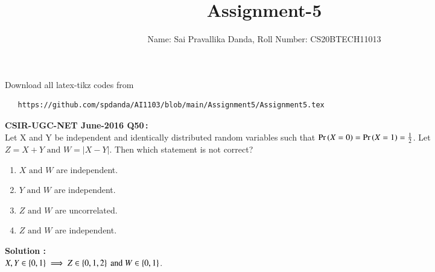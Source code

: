 \documentclass[journal,12pt,twocolumn]{IEEEtran}
\DeclareMathOperator*{\Res}{Res}
\renewcommand{\thefigure}{\theenumi}
\renewcommand{\thetable}{\theenumi}
\begin{document}
\newcommand{\sgn}{\mathop{\mathrm{sgn}}}
\providecommand{\abs}[1]{\vert#1\vert}
\providecommand{\res}[1]{\Res\displaylimits_{#1}} 
\providecommand{\norm}[1]{\lVert#1\rVert}
\providecommand{\mtx}[1]{\mathbf{#1}}
\providecommand{\mean}[1]{E[ #1 ]}
\providecommand{\fourier}{\overset{\mathcal{F}}{ \rightleftharpoons}}
\providecommand{\system}{\overset{\mathcal{H}}{ \longleftrightarrow}}
\newcommand{\solution}{\noindent \textbf{Solution: }}
\newcommand{\cosec}{\,\text{cosec}\,}
\providecommand{\dec}[2]{\ensuremath{\overset{#1}{\underset{#2}{\gtrless}}}}
\newcommand{\myvec}[1]{\ensuremath{\begin{pmatrix}#1\end{pmatrix}}}
\newcommand{\mydet}[1]{\ensuremath{\begin{vmatrix}#1\end{vmatrix}}}
\makeatletter
{}
\makeatother
\let\StandardTheFigure\thefigure
\let\vec\mathbf
\renewcommand{\thefigure}{\theproblem}
\def\putbox#1#2#3{\makebox[0in][l]{\makebox[#1][l]{}\raisebox{\baselineskip}[0in][0in]{\raisebox{#2}[0in][0in]{#3}}}}
     \def\rightbox#1{\makebox[0in][r]{#1}}
     \def\centbox#1{\makebox[0in]{#1}}
     \def\topbox#1{\raisebox{-\baselineskip}[0in][0in]{#1}}
     \def\midbox#1{\raisebox{-0.5\baselineskip}[0in][0in]{#1}}
\vspace{3cm}
\title{Assignment-5}
\author{Name: Sai Pravallika Danda, Roll Number: CS20BTECH11013}
\maketitle
\newpage
\bigskip
\renewcommand{\thefigure}{\theenumi}
\renewcommand{\thetable}{\theenumi}
Download all latex-tikz codes from
\begin{lstlisting}
   https://github.com/spdanda/AI1103/blob/main/Assignment5/Assignment5.tex
\end{lstlisting}
\large\textbf{CSIR-UGC-NET June-2016 Q50\,:}\\
 Let X and Y be independent and identically distributed random variables such that \(\Pr\left(X=0\right)=\Pr\left(X=1\right)= \frac{1}{2}\). Let \(Z = X+Y \text{ and } W = \abs{X-Y}\). Then which statement is not correct?
 \begin{enumerate}
     \item $X \text{ and } W$ are independent.
     \item $Y \text{ and } W$ are independent.
     \item $Z \text{ and } W$ are uncorrelated.
     \item $Z \text{ and } W$ are independent.
 \end{enumerate}
\textbf{Solution :}\\
$X, Y \in \left\{0,1\right\}
\implies Z \in \left\{0,1,2\right\} \text{ and } W \in \left\{0,1\right\}$.
\end{document}
